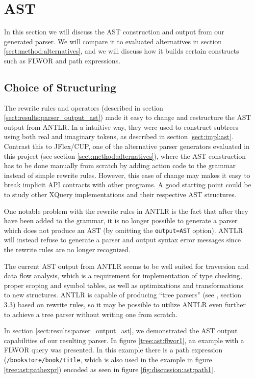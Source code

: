 \section{AST}
\label{sect:discussion:ast}
In this section we will discuss the AST construction and output from our generated
parser. We will compare it to evaluated alternatives in section
\ref{sect:method:alternatives}, and we will discuss how it builds certain
constructs such as FLWOR and path expressions.

\subsection{Choice of Structuring}
\label{sect:discussion:ast:structuring}
The rewrite rules and operators (described in section
\ref{sect:results:parser_output_ast}) made it easy to change and restructure the
AST output from ANTLR. In a intuitive way, they were used to construct subtrees
using both real and imaginary tokens, as described in section
\ref{sect:impl:ast}. Contrast this to JFlex/CUP, one of the alternative
parser generators evaluated in this project (see section
\ref{sect:method:alternatives}), where the AST construction has to be done
manually from scratch by adding action code to the grammar instead of simple
rewrite rules. However, this ease of change may makes it easy to break implicit
API contracts with other programs. A good starting point could be to study other
XQuery implementations and their respective AST structures. 

One notable problem with the rewrite rules in ANTLR is the fact that after they
have been added to the grammar, it is no longer possible to generate a parser
which does not produce an AST (by omitting the \verb!output=AST! option). ANTLR will
instead refuse to generate a parser and output syntax error messages since the rewrite
rules are no longer recognized.

The current AST output from ANTLR seems to be well suited for traversion and data
flow analysis, which is a requirement for implementation of type checking,
proper scoping and symbol tables, as well as optimizations and transformations
to new structures. ANTLR is capable of producing ``tree parsers'' (see
\cite{definitiveAntlr}, section 3.3) based on rewrite rules, so it may be
possible to utilize ANTLR even further to achieve a tree
parser without writing one from scratch.

In section \ref{sect:results:parser_output_ast}, we demonstrated the AST output
capabilities of our resulting parser. In figure \ref{tree:ast:flwor1}, an
example with a FLWOR query was presented. In this example there is a path
expression (\verb!/bookstore/book/title!, which is also used in the example in
figure \ref{tree:ast:pathexpr}) encoded as seen in figure
\ref{fig:discussion:ast:path1}. 

